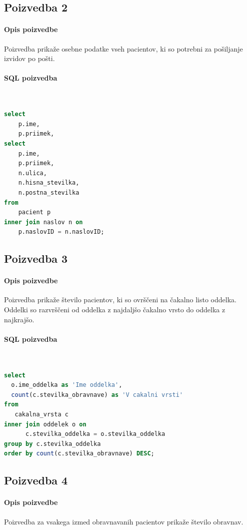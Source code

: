 \documentclass[a4paper,12pt]{report}
\begin{document}
\pagebreak
\subsection*{Poizvedba 2}
\paragraph{Opis poizvedbe}
Poizvedba prikaže osebne podatke vseh pacientov, ki so potrebni za pošiljanje izvidov po pošti.

\paragraph{SQL poizvedba}\mbox{}\\
\begin{lstlisting}[language = SQL]
select
    p.ime,
    p.priimek,
select
    p.ime,
    p.priimek,
    n.ulica,
    n.hisna_stevilka,
    n.postna_stevilka
from
    pacient p
inner join naslov n on
    p.naslovID = n.naslovID;
\end{lstlisting}

\subsection*{Poizvedba 3}
\paragraph{Opis poizvedbe}
Poizvedba prikaže število pacientov, ki so ovrščeni na čakalno listo oddelka. Oddelki so razvrščeni od oddelka z najdaljšo čakalno vrsto do oddelka z najkrajšo.

\paragraph{SQL poizvedba}\mbox{}\\
\begin{lstlisting}[language = SQL]
select
  o.ime_oddelka as 'Ime oddelka',
  count(c.stevilka_obravnave) as 'V cakalni vrsti'
from
   cakalna_vrsta c
inner join oddelek o on 
      c.stevilka_oddelka = o.stevilka_oddelka
group by c.stevilka_oddelka
order by count(c.stevilka_obravnave) DESC;
\end{lstlisting}


\subsection*{Poizvedba 4}
\paragraph{Opis poizvedbe}
Poizvedba za vsakega izmed obravnavanih pacientov prikaže število obravnav.
\end{document}
